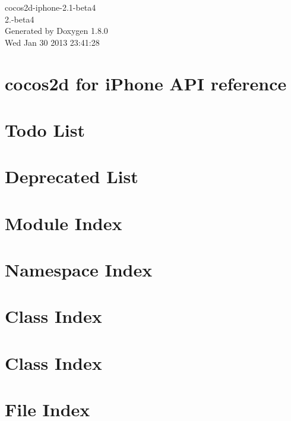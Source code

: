 \documentclass{book}
\begin{document}
\hypersetup{pageanchor=false,citecolor=blue}
\begin{titlepage}
\vspace*{7cm}
\begin{center}
{\Large cocos2d-\/iphone-\/2.1-\/beta4 \\[1ex]\large 2.-\/beta4 }\\
\vspace*{1cm}
{\large Generated by Doxygen 1.8.0}\\
\vspace*{0.5cm}
{\small Wed Jan 30 2013 23:41:28}\\
\end{center}
\end{titlepage}
\clearemptydoublepage
{}
\tableofcontents
\clearemptydoublepage
{}
\hypersetup{pageanchor=true,citecolor=blue}
\chapter{cocos2d for i\-Phone A\-P\-I reference}
\label{index}\hypertarget{index}{}
\chapter{Todo List}
\label{todo}
\hypertarget{todo}{}

\chapter{Deprecated List}
\label{deprecated}
\hypertarget{deprecated}{}

\chapter{Module Index}

\chapter{Namespace Index}

\chapter{Class Index}

\chapter{Class Index}

\chapter{File Index}

\end{document}
